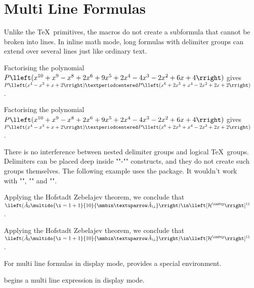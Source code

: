 \documentclass{longmath-doc}
\begin{document}
\section{Multi Line Formulas}
\label{multiline}
Unlike the \TeX\ primitives, the  macros do not create a subformula that cannot be broken into lines. In inline math mode, long formulas with delimiter groups can extend over several lines just like ordinary text. 
\begin{code*}
  \newcommand\polyA{ x^{10} + x^9 - x^8 + 2 x^6 + 9 x^5 + 2 x^4 - 4 x^3 - 2 x^2 + 6 x + 4 }
  \newcommand\polyB{ x^4 - x^3 + x + 2 } \newcommand\polyC{ x^6 + 2 x^5 + x^4 - 2 x^2 + 2 x + 2 }
\end{code*}
  \newcommand\polyA{ x^{10} + x^9 - x^8 + 2 x^6 + 9 x^5 + 2 x^4 - 4 x^3 - 2 x^2 + 6 x + 4 }
  \newcommand\polyB{ x^4 - x^3 + x + 2 } \newcommand\polyC{ x^6 + 2 x^5 + x^4 - 2 x^2 + 2 x + 2 }
\begin{code+}
   Factorising the polynomial 
   $ P\lleft( \polyA \rright) $
   gives $ P \lleft( \polyB \rright)  
         · P \lleft( \polyC \rright) $.       %
\end{code+}
\begin{exec*}\openup 1pt
   Factorising the polynomial 
   $ P\lleft( \polyA \rright) $
   gives $ P \lleft( \polyB \rright)  
         · P \lleft( \polyC \rright) $. 
\end{exec*}
There is no interference between nested delimiter groups and logical \TeX\ groups. Delimiters can be placed deep inside "\begingroup"-"\endgroup" constructs, and they do not create such groups themselves. The following example uses the  package. It wouldn't work with "\left", "\right" and "\middle".  
\begin{code}
  Applying the Hofstadt Zebelajev theorem, we conclude that 
  $ \lleft( \hat A_0 
      \multido{\i=1+1}{10}{ \mmbin \uparrow \hat A_{\i} } 
        \rright) \in \lleft[\mathcal{H}^\infty\rright]^{11}$.
\end{code} 
\begin{exec*}\openup 2pt
  Applying the Hofstadt Zebelajev theorem, we conclude that 
  $ \lleft( \hat A_0 
      \multido{\i=1+1}{10}{ \mmbin \uparrow \hat A_{\i} } 
        \rright) \in \lleft[\mathcal{H}^\infty\rright]^{11}$.
\end{exec*}
For multi line formulas in display mode,  provides a special environment. 

 begins a multi line expression in display mode.
         
\end{document}
